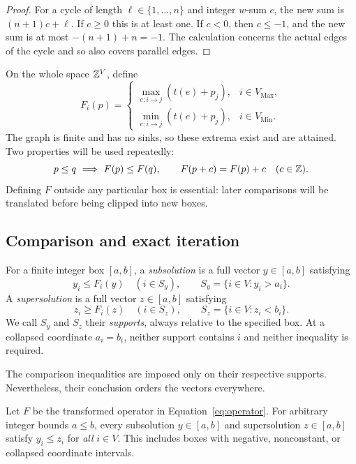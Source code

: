 \begin{proof}
For a cycle of length $\ell\in\{1,\ldots,n\}$ and integer $w$-sum $c$,
the new sum is $(n+1)c+\ell$. If $c\ge0$ this is at least one. If $c<0$,
then $c\le-1$, and the new sum is at most $-(n+1)+n=-1$.
The calculation concerns the actual edges of the cycle and so also covers
parallel edges.
\end{proof}

On the whole space $\mathbb Z^V$, define
\begin{equation}\label{eq:operator}
 F_i(p)=
 \begin{cases}
  \displaystyle\max_{e:i\to j}(t(e)+p_j),&i\in V_{\mathrm{Max}},\\[2mm]
  \displaystyle\min_{e:i\to j}(t(e)+p_j),&i\in V_{\mathrm{Min}}.
 \end{cases}
\end{equation}
The graph is finite and has no sinks, so these extrema exist and are
attained. Two properties will be used repeatedly:
\begin{equation}\label{box:operator-properties}
 p\le q\ \Longrightarrow\ F(p)\le F(q),\qquad
 F(p+c)=F(p)+c\quad(c\in\mathbb Z).
\end{equation}
Defining $F$ outside any particular box is essential: later comparisons
will be translated before being clipped into new boxes.

\subsection{Comparison and exact iteration}

\begin{definition}\label{def:box-comparisons}
For a finite integer box $[a,b]$, a \emph{subsolution} is a full vector
$y\in[a,b]$ satisfying
\[
 y_i\le F_i(y)\quad(i\in S_y),\qquad S_y=\{i\in V:y_i>a_i\}.
\]
A \emph{supersolution} is a full vector $z\in[a,b]$ satisfying
\[
 z_i\ge F_i(z)\quad(i\in S_z),\qquad S_z=\{i\in V:z_i<b_i\}.
\]
We call $S_y$ and $S_z$ their \emph{supports}, always relative to the
specified box. At a collapsed coordinate $a_i=b_i$, neither support
contains $i$ and neither inequality is required.
\end{definition}

The comparison inequalities are imposed only on their respective
supports. Nevertheless, their conclusion orders the vectors everywhere.

\begin{lemma}\label{lem:box-comparison}
Let $F$ be the transformed operator in Equation~\eqref{eq:operator}.
For arbitrary integer bounds $a\le b$, every subsolution $y\in[a,b]$
and supersolution $z\in[a,b]$ satisfy $y_i\le z_i$ for \emph{all}
$i\in V$. This includes boxes with negative, nonconstant, or collapsed
coordinate intervals.
\end{lemma}

